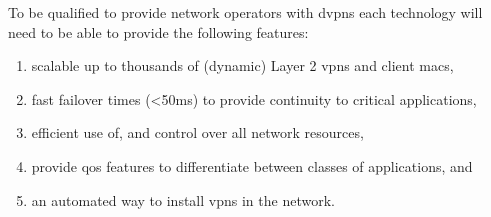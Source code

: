 To be qualified to provide network operators with \acp{dvpn} each technology will need to be able to provide the following features:

\begin{enumerate}
	\item scalable up to thousands of (dynamic) Layer 2 \acp{vpn} and client \acsp{mac},
	\item fast failover times (<50ms) to provide continuity to critical applications,
	\item efficient use of, and control over all network resources,
	\item provide \acl{qos} features to differentiate between classes of applications, and
	\item an automated way to install \acp{vpn} in the network.
\end{enumerate}

